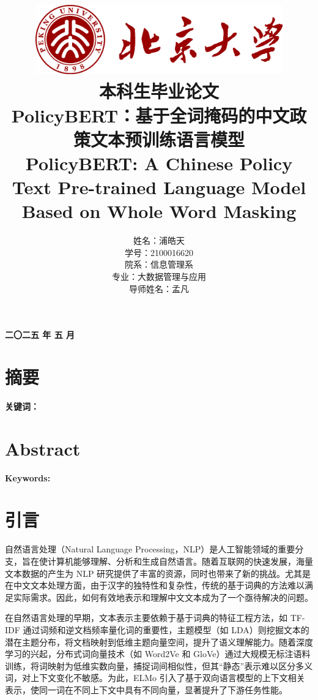 \documentclass[12pt, a4paper]{ctexart}
\title{
    \includegraphics[width=0.8\textwidth]{./images/logo.png} \\[1em] %
    {\fontsize{40pt}{24pt}\selectfont \textbf 本科生毕业论文} \\[2em] %
    \textbf PolicyBERT：基于全词掩码的中文政策文本预训练语言模型 \\[1em]
    PolicyBERT: A Chinese Policy Text Pre-trained Language Model Based on Whole Word Masking  \\[3em] %
}
\author{姓名：浦皓天 \\
学号：2100016620 \\
院系：信息管理系 \\
专业：大数据管理与应用 \\
导师姓名：孟凡}
\date{}
\begin{document}
\maketitle
\vfill
\begin{center}
    \textbf{二〇二五 年 五 月} \\[1em] %
\end{center}

\newpage
\section*{摘要}

\vspace{2em} %

\textbf{关键词：}
\vspace{2em} %

\newpage
\section*{Abstract}


\vspace{2em} %

\textbf{Keywords:} 

\newpage
\tableofcontents %
\newpage


\section{引言}
自然语言处理（Natural Language Processing，NLP）是人工智能领域的重要分支，旨在使计算机能够理解、分析和生成自然语言。随着互联网的快速发展，海量文本数据的产生为 NLP 研究提供了丰富的资源，同时也带来了新的挑战。尤其是在中文文本处理方面，由于汉字的独特性和复杂性，传统的基于词典的方法难以满足实际需求。因此，如何有效地表示和理解中文文本成为了一个亟待解决的问题。

在自然语言处理的早期，文本表示主要依赖于基于词典的特征工程方法，如 TF-IDF 通过词频和逆文档频率量化词的重要性\cite{SALTON1988513}，主题模型（如 LDA）则挖掘文本的潜在主题分布，将文档映射到低维主题向量空间，提升了语义理解能力\cite{10.5555/944919.944937}。随着深度学习的兴起，分布式词向量技术（如 Word2Ve\cite{mikolov2013efficientestimationwordrepresentations} 和 GloVe\cite{pennington-etal-2014-glove}）通过大规模无标注语料训练，将词映射为低维实数向量，捕捉词间相似性，但其“静态”表示难以区分多义词，对上下文变化不敏感。为此，ELMo 引入了基于双向语言模型的上下文相关表示，使同一词在不同上下文中具有不同向量，显著提升了下游任务性能\cite{peters-etal-2018-deep}。
\end{document}
